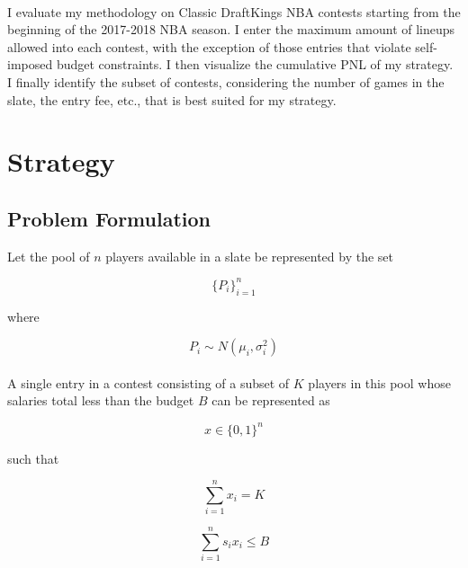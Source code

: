 \documentclass{article}
\begin{document}
\\
I evaluate my methodology on Classic DraftKings NBA contests starting from the beginning of the 2017-2018 NBA season. I enter the maximum amount of lineups allowed into each contest, with the exception of those entries that violate self-imposed budget constraints. I then visualize the cumulative PNL of my strategy. I finally identify the subset of contests, considering the number of games in the slate, the entry fee, etc., that is best suited for my strategy.
\\

\section{Strategy}

\subsection{Problem Formulation}

Let the pool of $n$ players available in a slate be represented by the set

\begin{equation}
\{P_{i}\}_{i=1}^n
\end{equation}

\begin{center}
where
\end{center}

\begin{equation}
P_{i} \sim N(\mu_i, \sigma^2_i)
\end{equation}\\

\noindent A single entry in a contest consisting of a subset of $K$ players in this pool whose salaries total less than the budget $B$ can be represented as 

\begin{equation}
x \in \{0, 1\}^n
\end{equation}

\begin{center}
such that
\end{center}

\begin{equation}
\sum_{i=1}^{n} x_i = K
\end{equation}

\begin{equation}
\sum_{i=1}^{n} s_i x_i \leq B
\end{equation}\\
\end{document}

